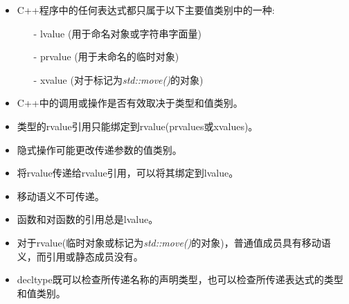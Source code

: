 \begin{itemize}
	\item C++程序中的任何表达式都只属于以下主要值类别中的一种:
	\begin{itemize}
		\item[-] lvalue (用于命名对象或字符串字面量)
		\item[-] prvalue (用于未命名的临时对象)
		\item[-] xvalue (对于标记为\textit{std::move()}的对象)
	\end{itemize}
	\item C++中的调用或操作是否有效取决于类型和值类别。
	\item 类型的rvalue引用只能绑定到rvalue(prvalues或xvalues)。
	\item 隐式操作可能更改传递参数的值类别。
	\item 将rvalue传递给rvalue引用，可以将其绑定到lvalue。
	\item 移动语义不可传递。
	\item 函数和对函数的引用总是lvalue。
	\item 对于rvalue(临时对象或标记为\textit{std::move()}的对象)，普通值成员具有移动语义，而引用或静态成员没有。
	\item decltype既可以检查所传递名称的声明类型，也可以检查所传递表达式的类型和值类别。
\end{itemize}


